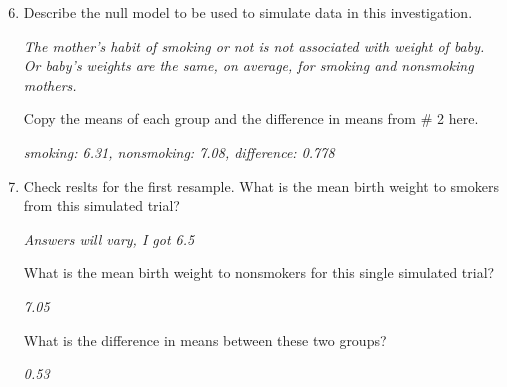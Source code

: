 \begin{enumerate}
  \setcounter{enumi}{5}
  \item  Describe the null model to be used to simulate data in this
    investigation. 
\begin{students}
\vspace{2cm}
\end{students}

\begin{key}
  {\it  The mother's habit of smoking or not is not
    associated with weight of baby. Or baby's weights are the same, on
    average, for smoking and nonsmoking mothers. }
\end{key}


    Copy the means of each group and the difference in means from \# 2
    here.
   
\begin{students}
\vspace{1cm}  
\end{students}

\begin{key}
  {\it  smoking: 6.31, nonsmoking: 7.08, difference: 0.778 }
\end{key}


\item  Check reslts for the first resample. What is the mean birth weight to
    smokers from this     simulated trial?  
\begin{students}
 \vspace{1cm}
\end{students}

\begin{key}
  {\it Answers will vary,  I got 6.5}
\end{key}

    
    What is the mean  birth weight to
    nonsmokers  for this single simulated trial?
\begin{students}
 \vspace{1cm}  
\end{students}

\begin{key}
  {\it 7.05}
\end{key}
            

    What is the difference in means between these two groups?
\begin{students}
 \vspace{1cm}
\end{students}

\begin{key}
  {\it 0.53}
\end{key}


\end{enumerate}
